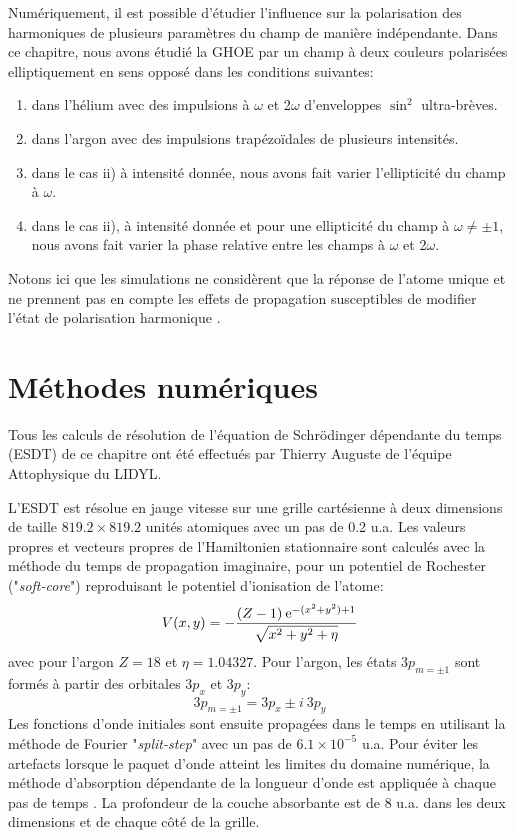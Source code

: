 Numériquement, il est possible d'étudier l'influence sur la polarisation des harmoniques de plusieurs paramètres du champ de manière indépendante. Dans ce chapitre, nous avons étudié la GHOE par un champ à deux couleurs polarisées elliptiquement en sens opposé dans les conditions suivantes:
\begin{enumerate}[label=\roman*)]
\item dans l'hélium avec des impulsions à $\omega$ et 2$\omega$ d'enveloppes $\sin^2$ ultra-brèves.
\item dans l'argon avec des impulsions trapézoïdales de plusieurs intensités.
\item dans le cas ii) à intensité donnée, nous avons fait varier l'ellipticité du champ à $\omega$.
\item dans le cas ii), à intensité donnée et pour une ellipticité du champ à $\omega \neq \pm 1$, nous avons fait varier la phase relative entre les champs à $\omega$ et 2$\omega$.
\end{enumerate}
Notons ici que les simulations ne considèrent que la réponse de l'atome unique et ne prennent pas en compte les effets de propagation susceptibles de modifier l'état de polarisation harmonique .

\section{Méthodes numériques}
Tous les calculs de résolution de l'équation de Schrödinger dépendante du temps (ESDT) de ce chapitre ont été effectués par Thierry Auguste de l'équipe Attophysique du LIDYL. 

L'ESDT est résolue en jauge vitesse sur une grille cartésienne à deux dimensions de taille $819.2 \times 819.2$ unités atomiques avec un pas de 0.2 u.a. Les valeurs propres et vecteurs propres de l'Hamiltonien stationnaire sont calculés avec la méthode du temps de propagation imaginaire, pour un potentiel de Rochester ("\textit{soft-core}") reproduisant le potentiel d'ionisation de l'atome:
\begin{equation}
V(x,y) = - \frac{(Z-1) \: \mathrm{e}^{-(x^2+y^2) + 1}}{\sqrt{x^2 + y^2 + \eta}}
\end{equation}
avec pour l'argon $Z = 18$ et $\eta = 1.04327$. Pour l'argon, les états $3p_{m=\pm 1}$ sont formés à partir des orbitales $3p_x$ et $3p_y$:
\begin{equation}
3p_{m=\pm 1} = 3p_x \pm i \: 3p_y
\end{equation}
Les fonctions d'onde initiales sont ensuite propagées dans le temps en utilisant la méthode de Fourier "\textit{split-step}"  avec un pas de $6.1 \times 10^{-5}$ u.a. Pour éviter les artefacts lorsque le paquet d'onde atteint les limites du domaine numérique, la méthode d'absorption dépendante de la longueur d'onde est appliquée à chaque pas de temps . La profondeur de la couche absorbante est de 8 u.a. dans les deux dimensions et de chaque côté de la grille.

